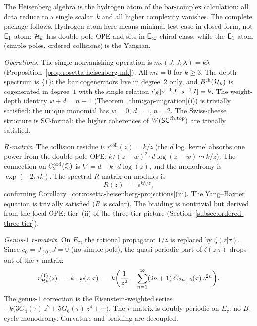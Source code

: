 \begin{computation}%
\label{comp:heisenberg-hydrogen-atom}%
%
%
The Heisenberg algebra is the hydrogen atom of the bar-complex
calculation: all data reduce to a single scalar~$k$ and all
higher complexity vanishes. The complete package follows.
Hydrogen-atom here means minimal test case in closed
form, not $\mathsf{E}_1$-atom: $\mathcal{H}_k$ has double-pole OPE and
sits in $\mathsf{E}_{\infty}$-chiral class, while the $\mathsf{E}_1$ atom (simple
poles, ordered collisions) is the Yangian.

\smallskip
\noindent
\emph{Operations.}
The single nonvanishing operation is
$m_2(J,J;\lambda) = k\lambda$
(Proposition~\ref{prop:rosetta-heisenberg-mk}).
All $m_k = 0$ for $k \ge 3$.
The depth spectrum is $\{1\}$: the bar
cogenerators live in degree~$2$ only, and
$\bar{B}^{\mathrm{ch}}(\mathcal{H}_k)$ is cogenerated in degree~$1$
with the single relation $d_{\bar{B}}[s^{-1}J\,|\,s^{-1}J] = k$.
The weight-depth identity $w + d = n - 1$ (Theorem~\ref{thm:gap-migration}(i)) is trivially satisfied: the unique monomial has $w = 0$, $d = 1$, $n = 2$.
The Swiss-cheese structure is SC-formal: the higher
coherences of $W(\mathsf{SC}^{\mathrm{ch,top}})$ are trivially satisfied.

\smallskip
\noindent
\emph{$R$-matrix.}
The collision residue is $r^{\mathrm{coll}}(z) = k/z$
(the $d\log$ kernel absorbs one power from the
double-pole OPE: $k/(z-w)^2 \cdot d\log(z-w)
\leadsto k/z$).
The connection on $C_2^{\mathrm{ord}}(\mathbb{C})$ is
$\nabla = d - k \cdot d\log(z)$,
and the monodromy is $\exp(-2\pi i k)$.
The spectral $R$-matrix on modules is
\begin{equation}\label{eq:heisenberg-hydrogen-R}
R(z) \;=\; e^{k\hbar/z},
\end{equation}
confirming
Corollary~\ref{cor:rosetta-heisenberg-projections}(iii).
The Yang--Baxter equation is trivially satisfied
($R$ is scalar). The braiding is nontrivial
but derived from the local OPE: tier~(ii) of the
three-tier picture
(Section~\ref{subsec:ordered-three-tier}).

\smallskip
\noindent
\emph{Genus-$1$ $r$-matrix.}
On $E_\tau$, the rational propagator $1/z$ is replaced by
$\zeta(z|\tau)$. Since $c_0 = J_{(0)}J = 0$
(no simple pole), the quasi-periodic part of
$\zeta(z|\tau)$ drops out of the $r$-matrix:
\begin{equation}\label{eq:heisenberg-hydrogen-genus1-r}
r^{(1)}_{\mathcal{H}_k}(z)
\;=\;
k \cdot \wp(z|\tau)
\;=\;
k\biggl(\frac{1}{z^2}
 - \sum_{n=1}^{\infty}(2n+1)\, G_{2n+2}(\tau)\, z^{2n}
\biggr).
\end{equation}
The genus-$1$ correction is the Eisenstein-weighted series
$-k\bigl(3G_4(\tau)\,z^2 + 5G_6(\tau)\,z^4 + \cdots\bigr)$.
The $r$-matrix is doubly periodic on $E_\tau$: no
$B$-cycle monodromy. Curvature and braiding are
decoupled.


\end{computation}
